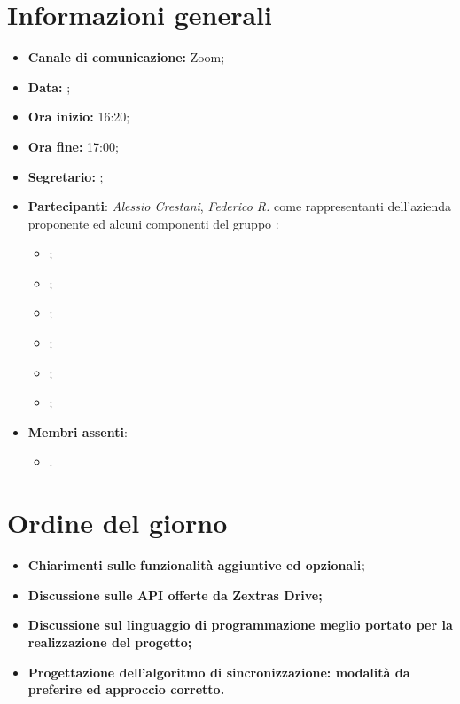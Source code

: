 \section{Informazioni generali}

\begin{itemize}

	\item \textbf{Canale di comunicazione:} Zoom;
	
	\item \textbf{Data:} \DataMeeting{};
	
	\item \textbf{Ora inizio:} 16:20;
	
	\item \textbf{Ora fine:} 17:00;
	
	\item \textbf{Segretario:} \Lucrezia{};
	
	\item \textbf{Partecipanti}: \textit{Alessio Crestani}, \textit{Federico R.} come rappresentanti dell'azienda proponente \proponente{} ed alcuni componenti del gruppo \Gruppo{}:
	
		\begin{itemize}
			\item \Daniele{};
			\item \Davide{};
			\item \Francesco{};
			\item \Giosue{};
			\item \Lucrezia{};
			\item \Matteo{};
		\end{itemize}



	\item \textbf{Membri assenti}:
		\begin{itemize}
			\item \Tommaso{}.
		\end{itemize}
	\end{itemize}
\section{Ordine del giorno}

\begin{itemize}
	\item\textbf{Chiarimenti sulle funzionalità aggiuntive ed opzionali;}
	\item\textbf{Discussione sulle API offerte da Zextras Drive;}
	\item\textbf{Discussione sul linguaggio di programmazione meglio portato per la realizzazione del progetto;}
	\item\textbf{Progettazione dell'algoritmo di sincronizzazione: modalità da preferire ed approccio corretto.}


\end{itemize}

